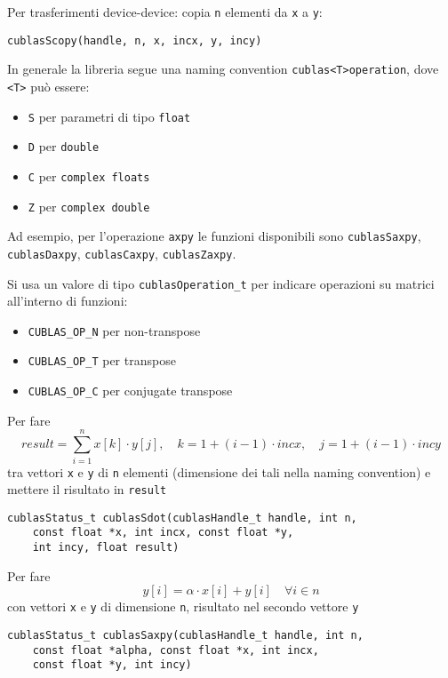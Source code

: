 Per trasferimenti device-device: copia \texttt{n} elementi da \texttt{x} a \texttt{y}:
\begin{verbatim}
cublasScopy(handle, n, x, incx, y, incy)
\end{verbatim}

In generale la libreria segue una naming convention \texttt{cublas<T>operation}, dove \texttt{<T>} può essere: 
\begin{itemize}
	\item \texttt{S} per parametri di tipo \texttt{float}

	\item \texttt{D} per \texttt{double}

	\item \texttt{C} per \texttt{complex  floats}

	\item \texttt{Z} per \texttt{complex double}
\end{itemize}
Ad esempio, per l'operazione \texttt{axpy} le funzioni disponibili sono \texttt{cublasSaxpy}, \texttt{cublasDaxpy}, \texttt{cublasCaxpy}, \texttt{cublasZaxpy}.

Si usa un valore di tipo \texttt{cublasOperation\_t} per indicare operazioni su matrici all'interno di funzioni: 
\begin{itemize}
	\item \texttt{CUBLAS\_OP\_N} per non-transpose

	\item \texttt{CUBLAS\_OP\_T} per transpose

	\item \texttt{CUBLAS\_OP\_C} per conjugate transpose
\end{itemize}

Per fare
$$ result = \sum_{i=1}^{n} x[k] \cdot y[j], \quad k = 1 + (i-1) \cdot incx, \quad j = 1 + (i-1) \cdot incy $$
tra vettori \texttt{x} e \texttt{y} di \texttt{n} elementi (dimensione dei tali nella naming convention) e mettere il risultato in \texttt{result}
\begin{verbatim}
cublasStatus_t cublasSdot(cublasHandle_t handle, int n, 
	const float *x, int incx, const float *y, 
	int incy, float result)
\end{verbatim}

Per fare 
$$ y[i] = \alpha \cdot x[i] + y[i] \quad \forall i \in n $$
con vettori \texttt{x} e \texttt{y} di dimensione \texttt{n}, risultato nel secondo vettore \texttt{y}
\begin{verbatim}
cublasStatus_t cublasSaxpy(cublasHandle_t handle, int n,
	const float *alpha, const float *x, int incx, 
	const float *y, int incy)
\end{verbatim}

